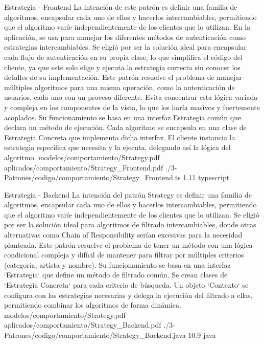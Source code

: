 \Patron
    {Estrategia - Frontend}
    {La intención de este patrón es definir una familia de algoritmos, encapsular cada uno de ellos y hacerlos intercambiables, permitiendo que el algoritmo varíe independientemente de los clientes que lo utilizan. En la aplicación, se usa para manejar los diferentes métodos de autenticación como estrategias intercambiables. Se eligió por ser la solución ideal para encapsular cada flujo de autenticación en su propia clase, lo que simplifica el código del cliente, ya que este solo elige y ejecuta la estrategia correcta sin conocer los detalles de su implementación.}
    {Este patrón resuelve el problema de manejar múltiples algoritmos para una misma operación, como la autenticación de usuarios, cada uno con un proceso diferente. Evita concentrar esta lógica variada y compleja en los componentes de la vista, lo que los haría masivos y fuertemente acoplados. Su funcionamiento se basa en una interfaz Estrategia común que declara un método de ejecución. Cada algoritmo se encapsula en una clase de Estrategia Concreta que implementa dicha interfaz. El cliente instancia la estrategia específica que necesita y la ejecuta, delegando así la lógica del algoritmo.}
    {modelos/comportamiento/Strategy.pdf}
    {aplicados/comportamiento/Strategy_Frontend.pdf}
    {./3-Patrones/codigo/comportamiento/Strategy_Frontend.ts}
    {1.1}{1}
    {typescript}
\newpage

\Patron
    {Estrategia - Backend}
    {La intención del patrón Strategy es definir una familia de algoritmos, encapsular cada uno de ellos y hacerlos intercambiables, permitiendo que el algoritmo varíe independientemente de los clientes que lo utilizan. Se eligió por ser la solución ideal para algoritmos de filtrado intercambiables, donde otras alternativas como Chain of Responsibility serían excesivas para la necesidad planteada.}
    {Este patrón resuelve el problema de tener un método con una lógica condicional compleja y difícil de mantener para filtrar por múltiples criterios (categoría, artista y nombre). Su funcionamiento se basa en una interfaz `Estrategia` que define un método de filtrado común. Se crean clases de `Estrategia Concreta` para cada criterio de búsqueda. Un objeto `Contexto` se configura con las estrategias necesarias y delega la ejecución del filtrado a ellas, permitiendo combinar los algoritmos de forma dinámica.}
    {modelos/comportamiento/Strategy.pdf}
    {aplicados/comportamiento/Strategy_Backend.pdf}
    {./3-Patrones/codigo/comportamiento/Strategy_Backend.java}
    {1}{0.9}
    {java}
\newpage

